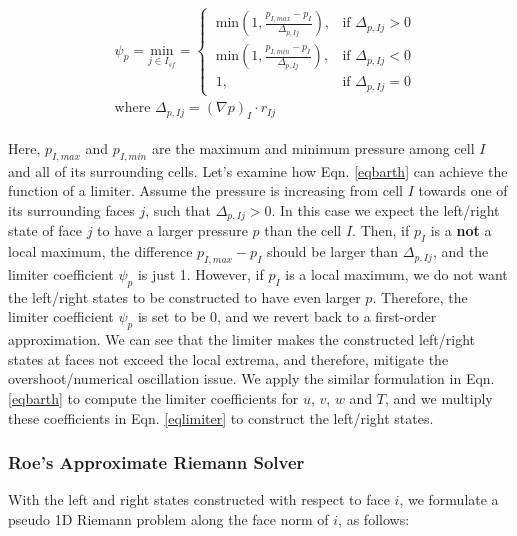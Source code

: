 \documentclass[12pt, letterpaper]{report}
\begin{document}
\begin{align}\label{eqbarth}
   \begin{split}
      &\psi_p = \underset{j \in I_{sf}}{\textrm{min}} =
      \begin{cases}
         \ \textrm{min}(1, \frac{p_{I,max}-p_I}{\Delta_{p, Ij}}), &\textrm{if }\Delta_{p, Ij} > 0 \\
         \ \textrm{min}(1, \frac{p_{I,min}-p_I}{\Delta_{p, Ij}}), &\textrm{if }\Delta_{p, Ij} < 0 \\
         \ 1, &\textrm{if }\Delta_{p, Ij} = 0 
      \end{cases} \\
      &\textrm{where }  \Delta_{p, Ij} = (\nabla p)_I \cdot r_{Ij}
   \end{split}
\end{align}

Here, $p_{I,max}$ and $p_{I,min}$ are the maximum and minimum pressure among cell $I$ and all of its
surrounding cells. Let's examine how Eqn. \ref{eqbarth} can achieve the function of a limiter.
Assume the pressure is increasing from cell $I$ towards one of its surrounding faces $j$, such
that $\Delta_{p,Ij} > 0$. In this case we expect the left/right state of face $j$ to have a larger
pressure $p$ than the cell $I$. Then, if $p_I$ is a {\bf not} a local maximum, the difference
$p_{I,max} - p_I$ should be larger than $\Delta_{p,Ij}$, and the limiter coefficient $\psi_p$ is
just 1. However, if $p_I$ is a local maximum, we do not want the left/right states to be constructed
to have even larger $p$. Therefore, the limiter coefficient $\psi_p$ is set to be 0, and we revert
back to a first-order approximation. We can see that the limiter makes the constructed left/right
states at faces not exceed the local extrema, and therefore, mitigate the overshoot/numerical
oscillation issue. We apply the similar formulation in Eqn. \ref{eqbarth} to compute the limiter
coefficients for $u$, $v$, $w$ and $T$, and we multiply these coefficients in Eqn. \ref{eqlimiter}
to construct the left/right states.

\subsubsection{Roe's Approximate Riemann Solver}

With the left and right states constructed with respect to face $i$, we formulate a pseudo 1D Riemann
problem along the face norm of $i$, as follows:
\end{document}
